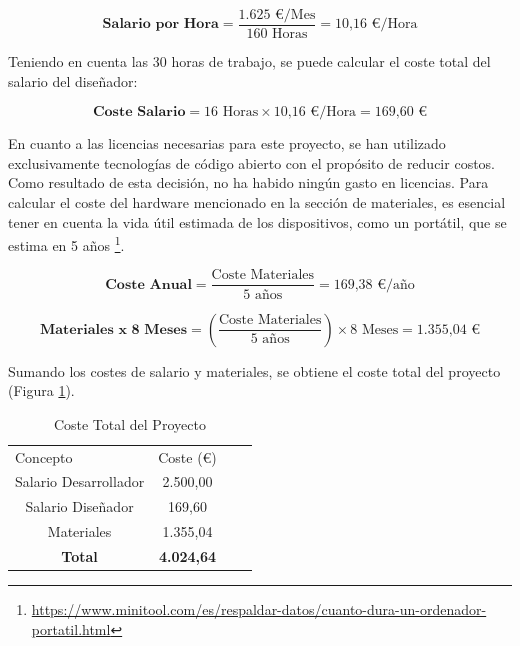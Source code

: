 \begin{equation}
    \textbf{Salario por Hora} = \frac {\text{1.625 €/Mes}}{160 \text{ Horas}} = \text{10,16 €/Hora}
\end{equation}

Teniendo en cuenta las 30 horas de trabajo, se puede calcular el coste total del salario del diseñador:

\begin{equation}
    \textbf{Coste Salario} = \text{16 Horas} \times \text{10,16 €/Hora} = \text{169,60 €}
\end{equation}

En cuanto a las licencias necesarias para este proyecto, se han utilizado exclusivamente tecnologías de código abierto con el propósito de reducir costos. Como resultado de esta decisión, no ha habido ningún gasto en licencias. Para calcular el coste del hardware mencionado en la sección de materiales, es esencial tener en cuenta la vida útil estimada de los dispositivos, como un portátil, que se estima en 5 años \footnote{\url{https://www.minitool.com/es/respaldar-datos/cuanto-dura-un-ordenador-portatil.html}}.

\begin{equation}
    \textbf{Coste Anual} = \frac {\text{Coste Materiales}}{\text{5 años}} = \text{169,38 €/año}
\end{equation}

\begin{equation}
    \textbf{Materiales x 8 Meses} = \left(\frac {\text{Coste Materiales}}{\text{5 años}}\right) \times 8 \text{ Meses} = \text{1.355,04 €}
\end{equation}

Sumando los costes de salario y materiales, se obtiene el coste total del proyecto (Figura \ref{tab:coste_total}).

\begin{table}[H]
    \centering
    \begin{tabular}{|c|c|ll}
    \cline{1-2}
    \multicolumn{1}{|l|}{Concepto} & \multicolumn{1}{l|}{Coste (€)} &  &  \\ \cline{1-2}
    Salario Desarrollador           & 2.500,00                        &  &  \\ \cline{1-2}
    Salario Diseñador               & 169,60                         &  &  \\ \cline{1-2}
    Materiales                      & 1.355,04                       &  &  \\ \cline{1-2}
    \textbf{Total}                   & \textbf{4.024,64}               &  &  \\ \cline{1-2}
    \end{tabular}
    \caption{Coste Total del Proyecto}
    \label{tab:coste_total}
\end{table}
